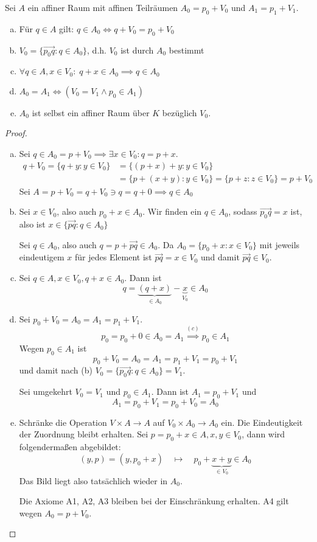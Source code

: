 \documentclass{mycourse}
\begin{document}
\begin{lem} 
	\label{df: 8.6}
Sei $A$ ein affiner Raum mit affinen Teilräumen $A_0=p_0+V_0$ und $A_1=p_1+V_1$.
\begin{enumerate}[(a)]
\item Für $q\in A$ gilt: $q\in A_0 \iff q+V_0 = p_0+V_0$
\item $V_0=\{\vec{p_0q}:q\in A_0\}$, d.h. $V_0$ ist durch $A_0$ bestimmt
\item $\forall q\in A, x\in V_0 :\; q+x\in A_0 \implies q\in A_0$
\item $A_0=A_1 \iff (V_0=V_1 \land p_0\in A_1)$
\item $A_0$ ist selbst ein affiner Raum über $K$ bezüglich $V_0$.
\end{enumerate}
\begin{proof}
\begin{enumerate}[(a)]
\item
	Sei $q\in A_0 = p+V_0 \implies \exists x\in V_0: q=p+x$.
	\begin{align*}
		q+V_0=\{q+y:y\in V_0\}&=\{(p+x)+y:y\in V_0\}\\
	&=\{p+(x+y):y\in V_0\}=\{p+z:z\in V_0\}=p+V_0
	\end{align*}
	Sei $A=p+V_0=q+V_0\ni q=q+0 \implies q\in A_0$
\item
	Sei $x\in V_0$, also auch $p_0+x\in A_0$.
	Wir finden ein $q\in A_0$, sodass $\vec{p_0q}=x$ ist, also ist $x\in \{\vec{pq}:q\in A_0\}$

	Sei $q\in A_0$, also auch $q=p+\vec{pq}\in A_0$.
	Da $A_0 =\{p_0+x:x\in V_0\}$ mit jeweils eindeutigem $x$ für jedes Element ist $\vec{pq}=x\in V_0$ und damit $\vec{pq}\in V_0$.
\item
	Sei $q\in A, x\in V_0, q+x\in A_0$.
	Dann ist
	\[
		q = \underbrace{(q+x)}_{\in A_0}-\underbrace x_{V_0} \in A_0
	\]
\item
	Sei $p_0+V_0=A_0=A_1=p_1+V_1$.
	\[
		p_0=p_0+0\in A_0=A_1 \stackrel{(c)}\implies p_0\in A_1
	\]
	Wegen $p_0\in A_1$ ist
	\[
		p_0 + V_0 = A_0 = A_1 = p_1 + V_1 = p_0 + V_1
	\]
	und damit nach (b) $V_0 = \{\vec{p_0q}:q\in A_0\} = V_1$.

	Sei umgekehrt $V_0=V_1$ und $p_0\in A_1$.
	Dann ist $A_1 = p_0 + V_1$ und
	\[
		A_1=p_0+V_1=p_0+V_0=A_0
	\]
\item
	Schränke die Operation $V\times A \to A$ auf $V_0\times A_0\to A_0$ ein.
	Die Eindeutigkeit der Zuordnung bleibt erhalten.
	Sei $p = p_0 + x \in A, x,y\in V_0$, dann wird folgendermaßen abgebildet:
	\[
		(y,p) = (y,p_0+x) \quad \mapsto \quad p_0 + \underbrace{x + y}_{\in V_0} \in A_0
	\]
	Das Bild liegt also tatsächlich wieder in $A_0$.

	Die Axiome A1, A2, A3 bleiben bei der Einschränkung erhalten.
	A4 gilt wegen $A_0=p+V_0$.
\end{enumerate}
\end{proof}
\end{lem}
\end{document}
